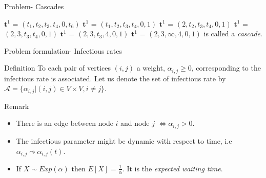 \documentclass{beamer}
\begin{document}
\begin{frame}{Problem- Cascades}
\begin{figure}
\begin{subfigure}{.4\textwidth}
\end{subfigure}
\end{figure}
 {$\textbf{t}^1$ = $(t_1,t_2,t_3,t_4,0,t_6)$}
 {$\textbf{t}^1$ = $(t_1,t_2,t_3,t_4,0,1)$}
 {$\textbf{t}^1$ = $(2,t_2,t_3,t_4,0,1)$}
 {$\textbf{t}^1$ = $(2,3,t_3,t_4,0,1)$}
 {$\textbf{t}^1$ = $(2,3,t_3,4,0,1)$}
 {$\textbf{t}^1$ = $(2,3,\infty,4,0,1)$ is called a \textit{cascade}.}
\end{frame}
\begin{frame}{Problem formulation- Infectious rates}
\begin{block}{Definition}
To each pair of vertices $(i,j)$ a weight, $\alpha_{i,j} \geq 0$, corresponding to the infectious rate is associated. Let us denote the set of infectious rate by $\mathscr{A} = \{\alpha_{i,j}|(i,j)\in V \times V, i\neq j\}.$
\end{block}
\begin{block}{Remark}
\begin{itemize}
    \item There is an edge between node $i$ and node $j$ $\iff \alpha_{i,j} > 0$.
    \item The infectious parameter might be dynamic with respect to time, i.e $\alpha_{i,j} \leadsto \alpha_{i,j}(t)$.
    \item If $X{\sim} Exp(\alpha)$ then $E[X]=\frac{1}{\alpha}$. It is the \textit{expected waiting time}.
\end{itemize}
\end{block}
\end{frame}
\end{document}

